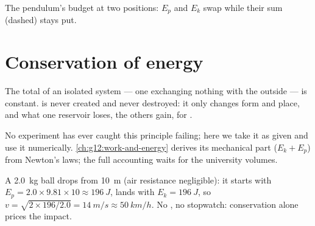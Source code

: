 \begin{omfigure}
\qquad
{}

{\small The pendulum's budget at two positions: $E_p$ and $E_k$
swap while their sum (dashed) stays put.}
\end{omfigure}

\section{Conservation of energy}

\begin{theorem}\label{thm:g10:energy-conservation:conservation}
The total  of an isolated system --- one exchanging nothing
with the outside --- is constant.  is never created and never
destroyed: it only changes form and place, and what one reservoir
loses, the others gain,  for .
\end{theorem}
\admitted

\begin{remark}\label{rem:g10:energy-conservation:admitted}
No experiment has ever caught this principle failing; here we take
it as given and use it numerically. \cref{ch:g12:work-and-energy}
derives its mechanical part ($E_k + E_p$) from Newton's laws; the
full accounting waits for the university volumes.
\end{remark}

\begin{example}\label{ex:g10:energy-conservation:fall}
A \qty{2.0}{kg} ball drops from \qty{10}{m} (air resistance
negligible): it starts with
$E_p = 2.0 \times 9.81 \times 10 \approx \qty{196}{J}$, lands with
$E_k = \qty{196}{J}$, so $v = \sqrt{2 \times 196/2.0} =
\qty{14}{m/s} \approx \qty{50}{km/h}$. No , no stopwatch:
conservation alone prices the impact.
\end{example}

